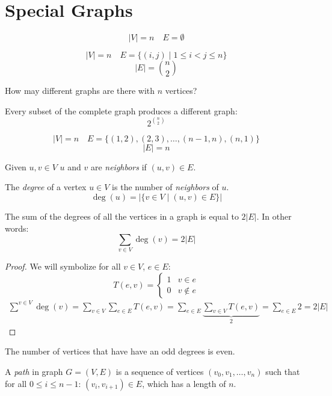 \documentclass[00_complete]{subfiles}
\begin{document}
\section{Special Graphs}
\begin{definition}
    $$|V|=n \quad E=\emptyset$$
\end{definition}
\begin{definition}
    $$|V|=n \quad E=\{(i,j) \mid 1 \leq i < j \leq n\}$$
    $$|E|=\binom{n}{2}$$
\end{definition}
How may different graphs are there with $n$ vertices?

Every subset of the complete graph produces a different graph:
$$2^{\binom{n}{2}}$$
\begin{definition}
    $$|V|=n \quad E=\{(1,2),(2,3),\dots,(n-1,n),(n,1)\}$$
    $$|E|=n$$
\end{definition}
\begin{definition}[Neighbors]
    Given $u,v \in V$ $u$ and $v$ are \emph{neighbors} if $(u,v) \in E$.
\end{definition}
\begin{definition}
    The \emph{degree} of a vertex $u \in V$ is the number of \emph{neighbors}
    of $u$.
    $$\deg(u) = |\{v \in V \mid (u,v) \in E\}|$$
\end{definition}
\begin{claim}
    The sum of the degrees of all the vertices in a graph is equal to $2|E|$.
    In other words:
    $$\sum_{v \in V}\deg(v) = 2|E|$$
\end{claim}
\begin{proof}
    We will symbolize for all $v \in V$, $e \in E$:
    $$T(e,v) = \begin{cases}
        1 & v \in e \\
        0 & v \notin e
    \end{cases}$$
    \begin{gather*}
        \sum^{v \in V}\deg(v) = \sum_{v \in V}\sum_{e \in E} T(e,v)= \sum_{e
        \in E}\underbrace{\sum_{v \in V} T(e,v)}_{2}=\sum_{e \in E}2=2|E|
    \end{gather*}
\end{proof}
\begin{conclusion}
    The number of vertices that have have an odd degrees is even.
\end{conclusion}
\begin{definition}[Path]
    A \emph{path} in graph $G=(V,E)$ is a sequence of vertices $(v_0,v_1,
    \dots, v_n)$ such that for all $0 \leq i \leq n-1$: $(v_i,v_{i+1}) \in E$,
    which has a length of $n$.
\end{definition}
\end{document}
